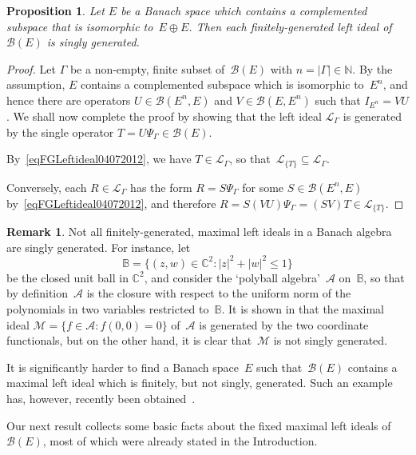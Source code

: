 \documentclass[12pt]{amsart}
\newtheorem{proposition}[theorem]{Proposition}
\theoremstyle{definition}
\newtheorem{remark}[theorem]{Remark}
\numberwithin{equation}{section}
\begin{document}
\begin{proposition}\label{cartesianSGnew}
  Let $E$ be a Banach space which contains a complemented subspace
  that is isomorphic to~$E\oplus E$. Then each finitely-generated left
  ideal of~$\mathscr{B}(E)$ is singly generated.
\end{proposition}
\begin{proof} Let $\Gamma$ be a non-empty, finite subset
  of~$\mathscr{B}(E)$ with $n=|\Gamma|\in{\ensuremath{\mathbb{N}}}$.  By the assumption, $E$
  contains a complemented subspace which is isomorphic to~$E^n$, and
  hence there are operators $U\in\mathscr{B}(E^n,E)$ and
  $V\in\mathscr{B}(E,E^n)$ such that $I_{E^n} = VU$. We shall now
  complete the proof by showing that the left ideal
  $\mathscr{L}_{\Gamma}$ is generated by the single operator $T =
  U\Psi_{\Gamma}\in\mathscr{B}(E)$.

  By~\eqref{eqFGLeftideal04072012}, we have
  $T\in\mathscr{L}_{\Gamma}$, so
  that~$\mathscr{L}_{\{T\}}\subseteq\mathscr{L}_{\Gamma}$.

  Conversely, each  $R\in\mathscr{L}_{\Gamma}$ has the form $R
  = S\Psi_{\Gamma}$ for some $S\in\mathscr{B}(E^n,E)$
  by~\eqref{eqFGLeftideal04072012}, and therefore $R =
  S(VU)\Psi_{\Gamma} = (SV)T\in\mathscr{L}_{\{T\}}$.
\end{proof}

\begin{remark} Not all finitely-generated, maximal left ideals in a
  Banach algebra are singly generated.  For instance, let $$\mathbb{B}
  = \{(z,w)\in {\ensuremath{\mathbb{C}}}^2 :| z|^2 + |w|^2{\ensuremath{\leqslant}} 1\}$$ be the closed unit ball
  in ${\ensuremath{\mathbb{C}}}^2$, and consider the `polyball algebra'~$\mathscr{A}$
  on~$\mathbb{B}$, so that by definition~$\mathscr{A}$ is the closure
  with respect to the uniform norm of the polynomials in two variables
  restricted to~$\mathbb{B}$.  It is shown in
  \cite[Ex\-am\-ple~15.8]{stout} that the maximal ideal
  $\mathscr{M}=\{f\in \mathscr{A}: f(0,0) =0\}$ of~$\mathscr{A}$ is
  generated by the two coordinate functionals, but on the other hand,
  it is clear that~$\mathscr{M}$ is not singly generated.

  It is significantly harder to find a Banach space~$E$ such
  that~$\mathscr{B}(E)$ contains a maximal left ideal which is
  finitely, but not singly, generated.  Such an example has, however,
  recently been obtained~\cite{kanialaustsen}.
\end{remark}

Our next result collects some basic facts about the fixed maximal left
ideals of~$\mathscr{B}(E)$, most of which were already stated in the
Introduction.
\end{document}
